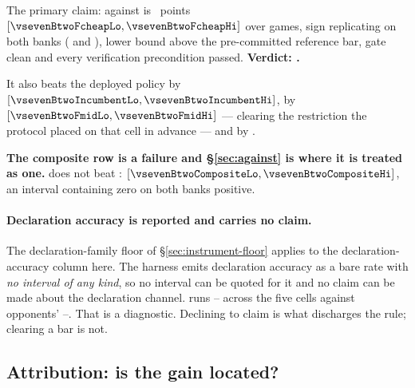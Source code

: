 The primary claim: \frozen{} against \fcheap{} is \textbf{\vsevenBtwoFcheap{}}~points
$[\vsevenBtwoFcheapLo, \vsevenBtwoFcheapHi]$ over \vsevenBtwoFcheapN{} games, sign replicating on both
banks (\vsevenBtwoFcheapBankOne{} and \vsevenBtwoFcheapBankTwo{}), lower bound above the
pre-committed \vsevenPrimaryFloor{} reference bar, gate clean and every verification precondition
passed. \textbf{Verdict: \vsevenPrimaryVerdict{}.}

It also beats the deployed policy by \vsevenBtwoIncumbent{}
$[\vsevenBtwoIncumbentLo, \vsevenBtwoIncumbentHi]$, \fmid{} by \vsevenBtwoFmid{}
$[\vsevenBtwoFmidLo, \vsevenBtwoFmidHi]$ --- clearing the restriction the protocol placed on that cell
in advance --- and \vfive{} by \vsevenBtwoVfive{}.

\textbf{The composite row is a failure and \S\ref{sec:against} is where it is treated as one.}
\frozen{} does not beat \composite{}: \vsevenBtwoComposite{}
$[\vsevenBtwoCompositeLo, \vsevenBtwoCompositeHi]$, an interval containing zero on both banks
positive.

\paragraph{Declaration accuracy is reported and carries no claim.}
The declaration-family floor of \S\ref{sec:instrument-floor} applies to the declaration-accuracy
column here. The harness emits declaration accuracy as a bare rate with \emph{no interval of any
kind}, so no interval can be quoted for it and no claim can be made about the declaration channel.
\frozen{} runs \vsevenDeclFrozenLo{}--\vsevenDeclFrozenHi{} across the five cells against opponents'
\vsevenDeclOppLo{}--\vsevenDeclOppHi{}. That is a diagnostic. Declining to claim is what discharges the
rule; clearing a bar is not.

\subsection{Attribution: is the gain located?}
\label{sec:results-attribution}

\begin{table}[t]\centering
\caption{The attribution lattice. Add-one-in is measured from the deployed policy; leave-one-out is
the drop from \frozen{}. Reference cell \frozen{} against \incumbent{} on the lattice banks:
\vsevenBfiveWhole{} $[\vsevenBfiveWholeLo, \vsevenBfiveWholeHi]$.}
\label{tab:attribution}
{\small}
\end{table}

